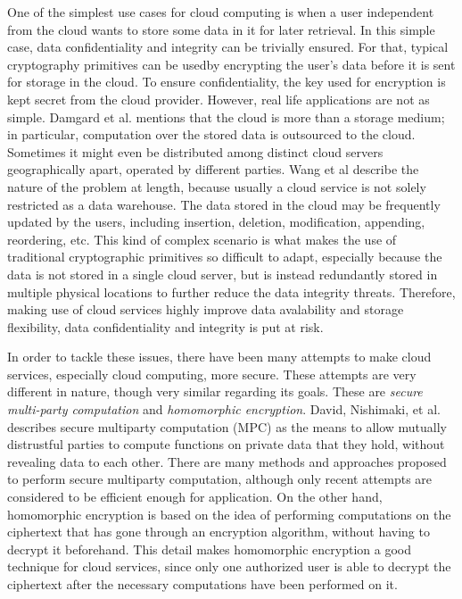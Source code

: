 One of the simplest use cases for cloud computing is when a user independent from the cloud wants to store some data in it for later retrieval. In this simple case, data confidentiality and integrity can be trivially ensured. For that, typical cryptography primitives can be usedby encrypting the user's data before it is sent for storage in the cloud. To ensure confidentiality, the key used for encryption is kept secret from the cloud provider. However, real life applications are not as simple. Damgard et al. \cite{cryptoeprint:2013:629} mentions that the cloud is more than a storage medium; in particular, computation over the stored data is outsourced to the cloud. Sometimes it might even be distributed among distinct cloud servers geographically apart, operated by different parties. Wang et al \cite{cryptoeprint:2009:081} describe the nature of the problem at length, because usually a cloud service is not solely restricted as a data warehouse. The data stored in the cloud may be frequently updated by the users, including insertion, deletion, modification, appending, reordering, etc. This kind of complex scenario is what makes the use of traditional cryptographic primitives so difficult to adapt, especially because the data is not stored in a single cloud server, but is instead redundantly stored in multiple physical locations to further reduce the data integrity threats. Therefore, making use of cloud services highly improve data avalability and storage flexibility, data confidentiality and integrity is put at risk.

In order to tackle these issues, there have been many attempts to make cloud services, especially cloud computing, more secure. These attempts are very different in nature, though very similar regarding its goals. These are \textit{secure multi-party computation} and \textit{homomorphic encryption}. David, Nishimaki, et al. \cite{cryptoeprint:2015:135} describes secure multiparty computation (MPC) as the means to allow mutually distrustful parties to compute functions on private data that they hold, without revealing data to each other. There are many methods and approaches proposed to perform secure multiparty computation, although only recent attempts are considered to be efficient enough for application. On the other hand, homomorphic encryption is based on the idea of performing computations on the ciphertext that has gone through an encryption algorithm, without having to decrypt it beforehand. This detail makes homomorphic encryption a good technique for cloud services, since only one authorized user is able to decrypt the ciphertext after the necessary computations have been performed on it.

